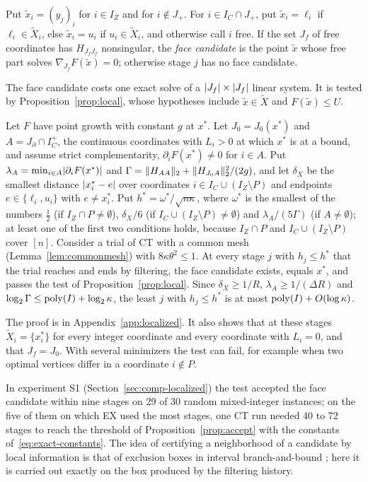 \begin{definition}\label{def:facecand}
Put $\tilde x_i=(y_j)_i$ for $i\in I_Z$ and for $i\notin J_+$. For
$i\in I_C\cap J_+$, put $\tilde x_i=\ell_i$ if $\ell_i\in\tilde X_i$, else
$\tilde x_i=u_i$ if $u_i\in\tilde X_i$, and otherwise call $i$ free. If the
set $J_f$ of free coordinates has $H_{J_fJ_f}$ nonsingular, the \emph{face
candidate} is the point $\tilde x$ whose free part solves
$\nabla_{J_f}F(\tilde x)=0$; otherwise stage $j$ has no face candidate.
\end{definition}

The face candidate costs one exact solve of a $\lvert J_f\rvert\times\lvert J_f\rvert$ linear
system. It is tested by Proposition~\ref{prop:local}, whose hypotheses
include $\tilde x\in\tilde X$ and $F(\tilde x)\le U$.

\begin{corollary}\label{cor:local}
Let $F$ have point growth with constant $g$ at $x^*$. Let $J_0=J_0(x^*)$ and
$A=J_\partial\cap I_C^+$, the continuous coordinates with $L_i>0$ at which
$x^*$ is at a bound, and assume strict complementarity,
$\partial_iF(x^*)\ne0$ for $i\in A$. Put
$\lambda_A=\min_{i\in A}\lvert \partial_iF(x^*)\rvert$ and
$\Gamma=\lVert H_{AA}\rVert_2+\lVert H_{J_0A}\rVert_2^2/(2g)$,
and let $\delta_X$ be the smallest distance $\lvert x^*_i-e\rvert$ over coordinates
$i\in I_C\cup(I_Z\setminus P)$ and endpoints $e\in\{\ell_i,u_i\}$ with
$e\ne x^*_i$. Put $h^*=\omega^*/\sqrt{n\kappa}$, where $\omega^*$ is the
smallest of the numbers $\frac12$ (if $I_Z\cap P\ne\emptyset$), $\delta_X/6$
(if $I_C\cup(I_Z\setminus P)\ne\emptyset$) and $\lambda_A/(5\Gamma)$ (if
$A\ne\emptyset$); at least one of the first two conditions holds, because
$I_Z\cap P$ and $I_C\cup(I_Z\setminus P)$ cover $[n]$. Consider a trial
of CT with a common mesh (Lemma~\ref{lem:commonmesh}) with
$8\kappa\theta^2\le1$. At every stage $j$ with $h_j\le h^*$ that the trial
reaches and ends by filtering, the face candidate exists, equals $x^*$, and
passes the test of Proposition~\ref{prop:local}. Since $\delta_X\ge1/R$,
$\lambda_A\ge1/(\Delta R)$ and $\log_2\Gamma\le\operatorname{poly}(I)+\log_2\kappa$, the
least $j$ with $h_j\le h^*$ is at most $\operatorname{poly}(I)+O(\log\kappa)$.
\end{corollary}

The proof is in Appendix~\ref{app:localized}. It also shows that at these
stages $\tilde X_i=\{x^*_i\}$ for every integer coordinate and every
coordinate with $L_i=0$, and that $J_f=J_0$. With several minimizers the test
can fail, for example when two optimal vertices differ in a coordinate
$i\notin P$.

In experiment S1 (Section~\ref{sec:comp-localized}) the test accepted the
face candidate within nine stages on 29 of 30 random mixed-integer instances;
on the five of them on which EX used the most stages, one CT run needed 40 to
72 stages to reach the threshold of Proposition~\ref{prop:accept} with the
constants of~\eqref{eq:exact-constants}. The idea of certifying a neighborhood of a
candidate by local information is that of exclusion boxes in interval
branch-and-bound \cite{Neumaier2004}; here it is carried out exactly on the
box produced by the filtering history.
